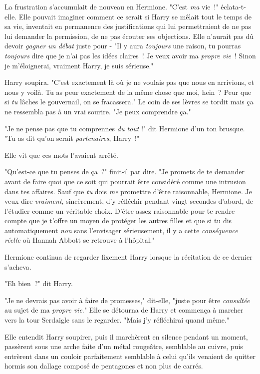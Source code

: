 La frustration s'accumulait de nouveau en Hermione. "C'est \emph{ma} vie~!" éclata-t-elle. Elle pouvait imaginer comment ce serait si Harry se mêlait tout le temps de sa vie, inventait en permanence des justifications qui lui permettraient de ne pas lui demander la permission, de ne pas écouter ses objections. Elle n'aurait pas dû devoir \emph{gagner un débat} juste pour - "Il y aura \emph{toujours} une raison, tu pourras \emph{toujours} dire que je n'ai pas les idées claires~! Je veux avoir ma \emph{propre vie}~! Sinon je m'éloignerai, vraiment Harry, je suis sérieuse."

Harry soupira. "C'est exactement là où je ne voulais pas que nous en arrivions, et nous y voilà. Tu as peur exactement de la même chose que moi, hein~? Peur que si \emph{tu} lâches le gouvernail, on se fracassera." Le coin de ses lèvres se tordit mais ça ne ressembla pas à un vrai sourire. "Je peux comprendre ça."

"Je ne pense pas que tu comprennes \emph{du tout} !" dit Hermione d'un ton brusque. "Tu as dit qu'on serait \emph{partenaires}, Harry~!"

Elle vit que ces mots l'avaient arrêté.

"Qu'est-ce que tu penses de ça~?" finit-il par dire. "Je promets de te demander avant de faire quoi que ce soit qui pourrait être considéré comme une intrusion dans tes affaires. Sauf que \emph{tu} dois \emph{me} promettre d'être raisonnable, Hermione. Je veux dire \emph{vraiment}, sincèrement, d'y réfléchir pendant vingt secondes d'abord, de l'étudier comme un véritable choix. D'être assez raisonnable pour te rendre compte que je t'offre un moyen de protéger les autres filles et que si tu dis automatiquement \emph{non} sans l'envisager sérieusement, il y a cette \emph{conséquence réelle} où Hannah Abbott se retrouve à l'hôpital."

Hermione continua de regarder fixement Harry lorsque la récitation de ce dernier s'acheva.

"Eh bien~?" dit Harry.

"Je ne devrais pas avoir à faire de promesses," dit-elle, "juste pour être \emph{consultée} au sujet de ma \emph{propre vie}." Elle se détourna de Harry et commença à marcher vers la tour Serdaigle sans le regarder. "Mais j'y réfléchirai quand même."

Elle entendit Harry soupirer, puis il marchèrent en silence pendant un moment, passèrent sous une arche faite d'un métal rougeâtre, semblable au cuivre, puis entrèrent dans un couloir parfaitement semblable à celui qu'ils venaient de quitter hormis son dallage composé de pentagones et non plus de carrés.

